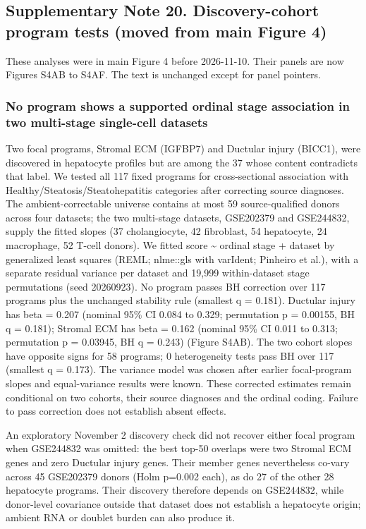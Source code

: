 \subsection{Supplementary Note 20. Discovery-cohort program tests (moved from main Figure 4)}\label{supplementary-note-20.-discovery-cohort-program-tests}

These analyses were in main Figure 4 before 2026-11-10. Their panels are now Figures S4AB to S4AF. The text is unchanged except for panel pointers.

\subsubsection{No program shows a supported ordinal stage association in two multi-stage single-cell datasets}\label{no-program-shows-a-supported-ordinal-stage-association-in-two-multi-stage-single-cell-datasets}

Two focal programs, Stromal ECM (IGFBP7) and Ductular injury (BICC1), were discovered in hepatocyte profiles but are among the 37 whose content contradicts that label. We tested all 117 fixed programs for cross-sectional association with Healthy/Steatosis/Steatohepatitis categories after correcting source diagnoses. The ambient-correctable universe contains at most 59 source-qualified donors across four datasets; the two multi-stage datasets, GSE202379 and GSE244832, supply the fitted slopes (37 cholangiocyte, 42 fibroblast, 54 hepatocyte, 24 macrophage, 52 T-cell donors). We fitted score \textasciitilde{} ordinal stage + dataset by generalized least squares (REML; nlme::gls with varIdent; Pinheiro et al.), with a separate residual variance per dataset and 19,999 within-dataset stage permutations (seed 20260923). No program passes BH correction over 117 programs plus the unchanged stability rule (smallest q = 0.181). Ductular injury has beta = 0.207 (nominal 95\% CI 0.084 to 0.329; permutation p = 0.00155, BH q = 0.181); Stromal ECM has beta = 0.162 (nominal 95\% CI 0.011 to 0.313; permutation p = 0.03945, BH q = 0.243) (Figure S4AB). The two cohort slopes have opposite signs for 58 programs; 0 heterogeneity tests pass BH over 117 (smallest q = 0.173). The variance model was chosen after earlier focal-program slopes and equal-variance results were known. These corrected estimates remain conditional on two cohorts, their source diagnoses and the ordinal coding. Failure to pass correction does not establish absent effects.

An exploratory November 2 discovery check did not recover either focal program when GSE244832 was omitted: the best top-50 overlaps were two Stromal ECM genes and zero Ductular injury genes. Their member genes nevertheless co-vary across 45 GSE202379 donors (Holm p=0.002 each), as do 27 of the other 28 hepatocyte programs. Their discovery therefore depends on GSE244832, while donor-level covariance outside that dataset does not establish a hepatocyte origin; ambient RNA or doublet burden can also produce it.

